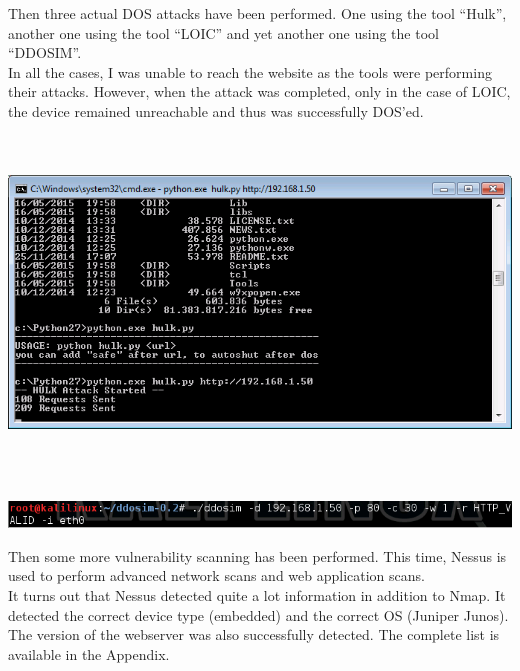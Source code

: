 \documentclass[11pt, a4paper]{article}
\begin{document}
Then three actual DOS attacks have been performed. One using the tool ``Hulk'', another one using the tool ``LOIC'' and yet another one using the tool ``DDOSIM''. \\
In all the cases, I was unable to reach the website as the tools were performing their attacks. However, when the attack was completed, only in the case of LOIC, the device remained unreachable and thus was successfully DOS'ed. \\
$\;$ \\ \\
\noindent\begin{minipage}{\textwidth}
    \centering
    \includegraphics[width=\textwidth]{DOS_1.png}
\end{minipage}
$\;$ \\ \\
\noindent\begin{minipage}{\textwidth}
    \centering
    \includegraphics[width=\textwidth]{DDOSIM.png}
\end{minipage}
\clearpage
Then some more vulnerability scanning has been performed. This time, Nessus is used to perform advanced network scans and web application scans. \\
It turns out that Nessus detected quite a lot information in addition to Nmap. It detected the correct device type (embedded) and the correct OS (Juniper Junos). The version of the webserver was also successfully detected. The complete list is available in the Appendix.
$\;$ \\ \\
\end{document}
